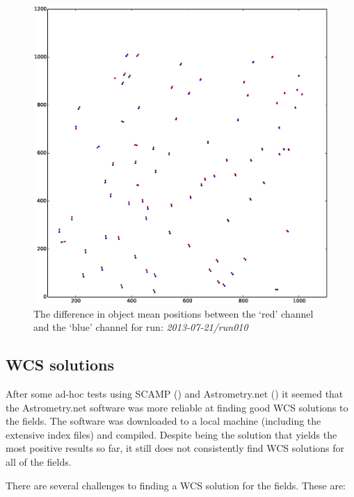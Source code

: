 \begin{figure}
  \centering
  \includegraphics[width=\textwidth]{images/objectOffset_run010_b.eps}
  \caption{The difference in object mean positions between the `red' channel and the `blue' channel for run: \emph{2013-07-21/run010} }
\label{fig:greenblueoffset}
\end{figure}

\subsection{WCS solutions}\label{sect:astrometry}

After some ad-hoc tests using SCAMP (\cite{scamp}) and Astrometry.net (\cite{astrometry}) it seemed that the Astrometry.net software was more reliable at finding good WCS solutions to the fields. The software was downloaded to a local machine (including the extensive index files) and compiled. Despite being the solution that yields the most positive results so far, it still does not consistently find WCS solutions for all of the fields. 

There are several challenges to finding a WCS solution for the fields.  These are:

